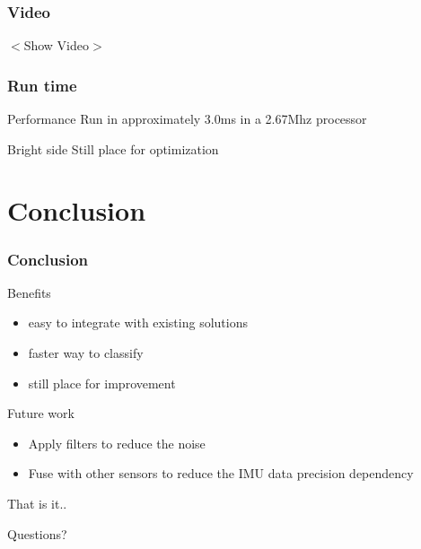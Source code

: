\documentclass{beamer}
\begin{document}
	\begin{frame}
		\frametitle{Video}
		\centering
		$<$Show Video$>$
		
	\end{frame}		

	\begin{frame}
		\frametitle{Run time}

		\begin{alertblock}{Performance}
			Run in approximately 3.0ms in a 2.67Mhz processor
		\end{alertblock}		
		
		\begin{exampleblock}{Bright side}
			Still place for optimization
		\end{exampleblock}				
		
	\end{frame}	

\section{Conclusion}

	\begin{frame}
		\frametitle{Conclusion}
		
		\begin{block}{Benefits}
			\begin{itemize}
			\item easy to integrate with existing solutions
			\item faster way to classify
			\item still place for improvement
			\end{itemize}
		\end{block}		
		
		\begin{block}{Future work}
			\begin{itemize}
			\item Apply filters to reduce the noise
			\item Fuse with other sensors to reduce the IMU data precision dependency
			\end{itemize}
		\end{block}
		
	\end{frame}

	\begin{frame}{That is it..}
	\begin{alertblock}{}
		\centering
		Questions?
	\end{alertblock}
	\end{frame} 	
 	
{} 	
\end{document}
